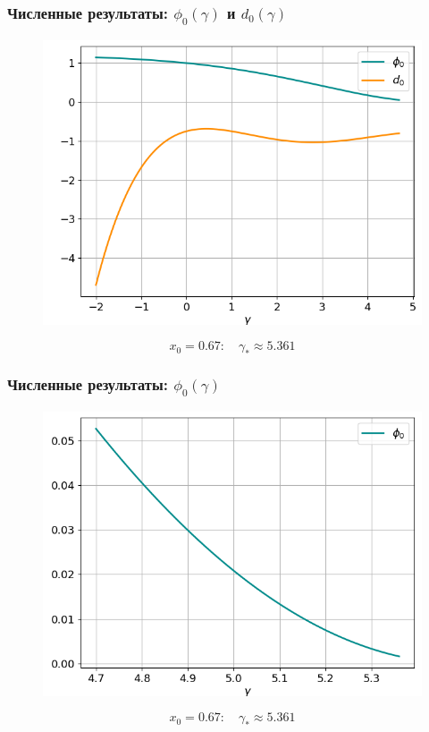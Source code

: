 \documentclass[fullscreen=true, unicode, bookmarks=false]{beamer}
\begin{document}
\begin{frame}
\frametitle{ Численные результаты: $ \phi_0(\gamma) $ и $ d_0(\gamma) $ }

\begin{figure} 
\includegraphics[scale=0.55]{divergent_phi0d0_23.png}  
\end{figure}

$$ x_0 = 0.67: \quad \gamma_* \approx 5.361 $$

\end{frame}

\begin{frame}
\frametitle{ Численные результаты: $ \phi_0(\gamma) $ }

\begin{figure} 
\includegraphics[scale=0.55]{divergent_phi0_23.png}  
\end{figure}

$$ x_0 = 0.67: \quad \gamma_* \approx 5.361 $$

\end{frame}
\end{document}
